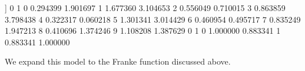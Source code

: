 \documentclass[letterpaper,10pt,english]{sphinxmanual}
\begin{document}
\begin{sphinxVerbatim}[commandchars=\\\{\}]
[[ 0.29439863  1.90169666]
 [ 1.67736015  3.10465335]
 [\PYGZhy{}0.55604865 \PYGZhy{}0.71001501]
 [\PYGZhy{}0.86385893 \PYGZhy{}3.79843757]
 [\PYGZhy{}0.32231733  0.0602184 ]
 [\PYGZhy{}1.30134141 \PYGZhy{}3.01442901]
 [\PYGZhy{}0.46095356  0.49571687]
 [ 0.83524925  1.94721304]
 [\PYGZhy{}0.41069583 \PYGZhy{}1.37424606]
 [ 1.10820768  1.38762934]]
          0         1
0  0.294399  1.901697
1  1.677360  3.104653
2 \PYGZhy{}0.556049 \PYGZhy{}0.710015
3 \PYGZhy{}0.863859 \PYGZhy{}3.798438
4 \PYGZhy{}0.322317  0.060218
5 \PYGZhy{}1.301341 \PYGZhy{}3.014429
6 \PYGZhy{}0.460954  0.495717
7  0.835249  1.947213
8 \PYGZhy{}0.410696 \PYGZhy{}1.374246
9  1.108208  1.387629
          0         1
0  1.000000  0.883341
1  0.883341  1.000000
\end{sphinxVerbatim}

We expand this model to the Franke function discussed above.
\end{document}
